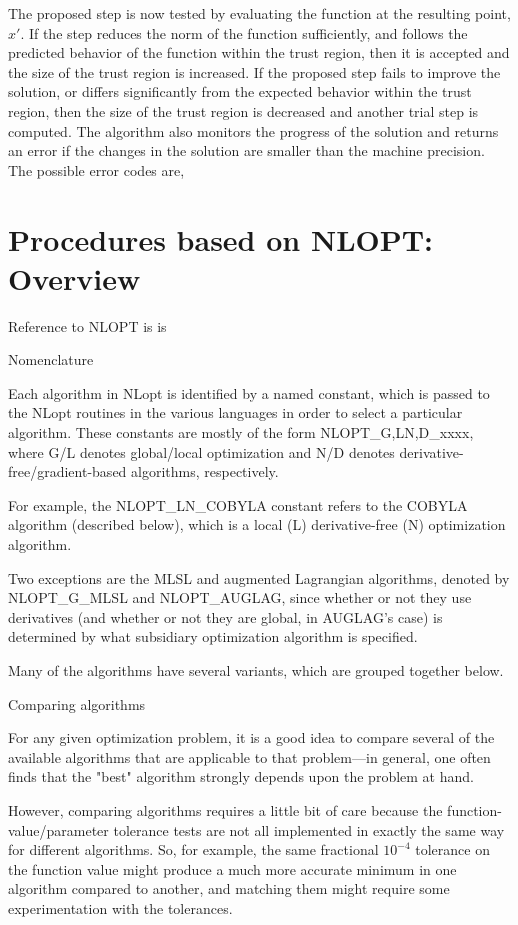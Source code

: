 The proposed step is now tested by evaluating the function at the resulting point,
$x′$. If the step reduces the norm of the function sufficiently, and follows the predicted
behavior of the function within the trust region, then it is accepted and the size of
the trust region is increased. If the proposed step fails to improve the solution, or
differs significantly from the expected behavior within the trust region, then the size
of the trust region is decreased and another trial step is computed.
The algorithm also monitors the progress of the solution and returns an error if the
changes in the solution are smaller than the machine precision. The possible error
codes are,






\section{Procedures based on NLOPT: Overview}

Reference to NLOPT is  is \cite{Johnson2012}


Nomenclature

Each algorithm in NLopt is identified by a named constant, which is passed to the NLopt routines in the various languages in order to select a particular algorithm. These constants are mostly of the form NLOPT\_{G,L}{N,D}\_xxxx, where G/L denotes global/local optimization and N/D denotes derivative-free/gradient-based algorithms, respectively. 

For example, the NLOPT\_LN\_COBYLA constant refers to the COBYLA algorithm (described below), which is a local (L) derivative-free (N) optimization algorithm. 

Two exceptions are the MLSL and augmented Lagrangian algorithms, denoted by NLOPT\_G\_MLSL and NLOPT\_AUGLAG, since whether or not they use derivatives (and whether or not they are global, in AUGLAG's case) is determined by what subsidiary optimization algorithm is specified. 

Many of the algorithms have several variants, which are grouped together below. 

Comparing algorithms

For any given optimization problem, it is a good idea to compare several of the available algorithms that are applicable to that problem—in general, one often finds that the "best" algorithm strongly depends upon the problem at hand. 

However, comparing algorithms requires a little bit of care because the function-value/parameter tolerance tests are not all implemented in exactly the same way for different algorithms. So, for example, the same fractional $10^{−4}$ tolerance on the function value might produce a much more accurate minimum in one algorithm compared to another, and matching them might require some experimentation with the tolerances. 

